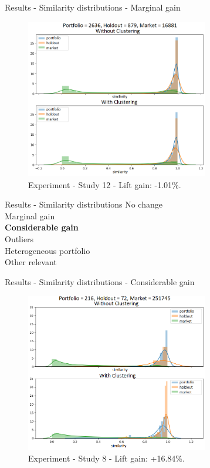 
\begin{frame}{Results - Similarity distributions - Marginal gain}
    \begin{figure}
        \centering
        \includegraphics[width=8cm]{fig/ch4-study-12-marginal-decrease-exp-1.png}
        \caption{Experiment \nameExperimentI{} - Study 12 - Lift gain: \colorbox{lred}{-1.01\%.}}
    \end{figure}
\end{frame}


\begin{frame}{Results - Similarity distributions}
    No change \\ 
    \vspace{0.5cm}
    Marginal gain \\
    \vspace{0.5cm}
    \textbf{Considerable gain} \\
    \vspace{0.5cm}
    Outliers \\
    \vspace{0.5cm}
    Heterogeneous portfolio \\
    \vspace{0.5cm}
    Other relevant 
\end{frame}


\begin{frame}{Results - Similarity distributions - Considerable gain}
    \begin{figure}
       \centering
       \includegraphics[width=8cm]{fig/ch4-study-8-considerable-increase-exp-2.png}
       \caption{Experiment \nameExperimentII{} - Study 8 - Lift gain: \colorbox{dgreen}{+16.84\%.}}
    \end{figure}
\end{frame}

